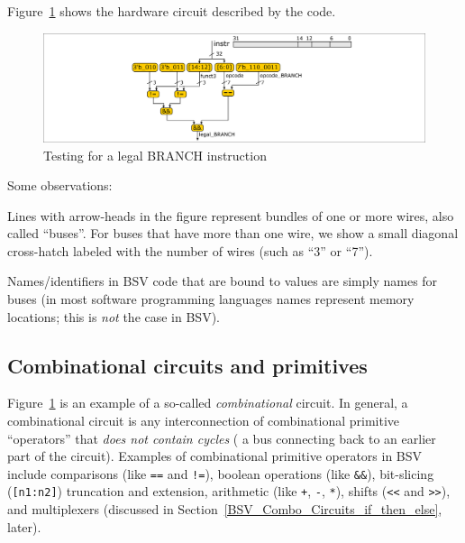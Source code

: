 Figure~\ref{Fig_Combo_Is_Legal_BRANCH} shows the hardware circuit described by the code.
\begin{figure}[htbp]
  \centerline{\includegraphics[width=6in,angle=0]{Figures/Fig_Combo_Is_Legal_BRANCH}}
  \caption{\label{Fig_Combo_Is_Legal_BRANCH}Testing for a legal BRANCH instruction}
\end{figure}
Some observations:
\begin{tightlist}

 \item Lines with arrow-heads in the figure represent bundles of one
   or more wires, also called ``buses''.  For buses that have more
   than one wire, we show a small diagonal cross-hatch labeled with
   the number of wires (such as ``3'' or ``7'').

 \item Names/identifiers in BSV code that are bound to values are
   simply names for buses (in most software programming languages
   names represent memory locations; this is \emph{not} the case in
   BSV).

\end{tightlist}


\subsection{Combinational circuits and primitives}


Figure~\ref{Fig_Combo_Is_Legal_BRANCH} is an example of a so-called
\emph{combinational} circuit.  In general, a combinational circuit is
any interconnection of combinational primitive ``operators'' that
\emph{does not contain cycles} ({\ie} a bus connecting back to an
earlier part of the circuit).  Examples of combinational primitive
operators in BSV include comparisons (like \verb|==| and \verb|!=|),
boolean operations (like \verb|&&|), bit-slicing (\verb|[n1:n2]|)
truncation and extension, arithmetic (like \verb|+|, \verb|-|,
\verb|*|), shifts (\verb|<<| and \verb|>>|), and multiplexers
(discussed in Section~\ref{BSV_Combo_Circuits_if_then_else}, later).


